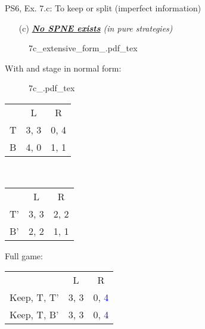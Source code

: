 \begin{frame}{PS6, Ex. 7.c: To keep or split (imperfect information)}
    \begin{itemize}
      \item[(c)] \textit{\textbf{\underline{No SPNE exists}} (in pure strategies)}
    \end{itemize}
    \vspace{-16pt}
    \begin{figure}[!h]
      \center
      \def\svgwidth{.8\columnwidth}
      {7c_extensive_form_.pdf_tex}
    \end{figure}
    \vspace{-8pt}
    \begin{multicols}{2}
      With  and  stage in normal form:
      \vspace{-4pt}
      \begin{figure}[!h]
        \center
        \def\svgwidth{.5\columnwidth}
        {7c_.pdf_tex}
      \end{figure}
      \vspace{-9pt}
      \begin{table}
        \begin{tabular}{l|c|c|}
          \multicolumn{1}{c}{} & \multicolumn{1}{c}{L} & \multicolumn{1}{c}{R} \\\cline{2-3}
          T & 3, 3 & 0, 4 \\\cline{2-3}
          B & 4, 0 & 1, 1 \\\cline{2-3}
        \end{tabular}\
        \begin{tabular}{l|c|c|}
          \multicolumn{1}{c}{} & \multicolumn{1}{c}{L} & \multicolumn{1}{c}{R} \\\cline{2-3}
          T' & 3, 3 & 2, 2 \\\cline{2-3}
          B' & 2, 2 & 1, 1 \\\cline{2-3}
        \end{tabular}
      \end{table}
    \vfill\null \columnbreak
    Full game:
    \vspace{-16pt}
    \begin{table}
      \begin{tabular}{l|c|c|}
        \multicolumn{1}{c}{} & \multicolumn{1}{c}{L} & \multicolumn{1}{c}{R} \\\cline{2-3}
        Keep, T, T' & 3, 3 & 0, \textcolor{blue}{4} \\\cline{2-3}
        Keep, T, B' & 3, 3 & 0, \textcolor{blue}{4} \\\cline{2-3}

\end{tabular}
\end{table}
\end{multicols}
\end{frame}
